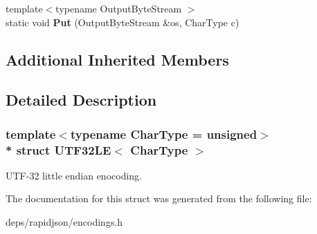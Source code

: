\begin{DoxyCompactItemize}
\item 
{\footnotesize template$<$typename Output\+Byte\+Stream $>$ }\\static void {\bfseries Put} (Output\+Byte\+Stream \&os, Char\+Type c)\hypertarget{struct_u_t_f32_l_e_a61bb50e7fba27e3fe28a9f30eb366193}{}\label{struct_u_t_f32_l_e_a61bb50e7fba27e3fe28a9f30eb366193}

\end{DoxyCompactItemize}
\subsection*{Additional Inherited Members}


\subsection{Detailed Description}
\subsubsection*{template$<$typename Char\+Type = unsigned$>$\\*
struct U\+T\+F32\+L\+E$<$ Char\+Type $>$}

U\+T\+F-\/32 little endian enocoding. 

The documentation for this struct was generated from the following file\+:\begin{DoxyCompactItemize}
\item 
deps/rapidjson/encodings.\+h\end{DoxyCompactItemize}
